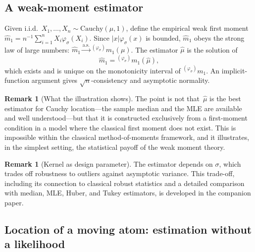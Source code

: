 \documentclass[12pt]{article}
\theoremstyle{definition}
\newtheorem{remark}[theorem]{Remark}
\begin{document}
\subsection{A weak-moment estimator}

Given i.i.d.\ $X_1,\dots,X_n\sim\mathrm{Cauchy}(\mu,1)$, define the empirical weak first moment $\widehat m_1 = n^{-1}\sum_{i=1}^n X_i\varphi_\sigma(X_i)$.  Since $|x|\varphi_\sigma(x)$ is bounded, $\widehat m_1$ obeys the strong law of large numbers: $\widehat m_1 \xrightarrow{\text{a.s.}} {}^{(\varphi_\sigma)}m_1(\mu)$.  The estimator $\widehat\mu$ is the solution of
\[
\widehat m_1 = {}^{(\varphi_\sigma)}m_1(\widehat\mu),
\]
which exists and is unique on the monotonicity interval of ${}^{(\varphi_\sigma)}m_1$.  An implicit-function argument gives $\sqrt{n}$-consistency and asymptotic normality.

\begin{remark}[What the illustration shows]
The point is not that~$\widehat\mu$ is the best estimator for Cauchy location---the sample median and the MLE are available and well understood---but that it is constructed exclusively from a first-moment condition in a model where the classical first moment does not exist.  This is impossible within the classical method-of-moments framework, and it illustrates, in the simplest setting, the statistical payoff of the weak moment theory.
\end{remark}

\begin{remark}[Kernel as design parameter]
The estimator depends on $\sigma$, which trades off robustness to outliers against asymptotic variance.  This trade-off, including its connection to classical robust statistics and a detailed comparison with median, MLE, Huber, and Tukey estimators, is developed in the companion paper.
\end{remark}

\subsection{Location of a moving atom: estimation without a likelihood}
\label{subsec:moving-atom-estimator}
\end{document}
